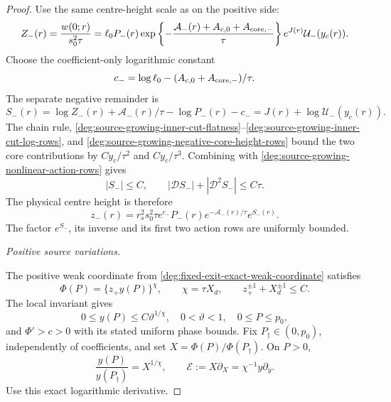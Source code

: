 \begin{proof}
Use the same centre-height scale as on the positive side:
\begin{equation}
 Z_-(r)=\frac{w(0;r)}{s_0^2\tau}
 =\ell_0P_-(r)
       \exp\left\{-\frac{\mathcal A_-(r)+A_{c,0}
                             +A_{\rm core,-}}{\tau}\right\}
       e^{J(r)}\mathcal U_-(y_c(r)).
 \label{deg:source-growing-negative-centre-height}
\end{equation}
Choose the coefficient-only logarithmic constant
\begin{equation}
 c_-=\log\ell_0-(A_{c,0}+A_{\rm core,-})/\tau .
 \label{deg:source-growing-negative-coefficient-constant}
\end{equation}
The separate negative remainder is
\begin{equation}
 S_-(r)=\log Z_-(r)+\mathcal A_-(r)/\tau
                            -\log P_-(r)-c_-
       =J(r)+\log \mathcal U_-(y_c(r)).
 \label{deg:source-growing-negative-source-remainder}
\end{equation}
The chain rule, \eqref{deg:source-growing-inner-cut-flatness}--\eqref{deg:source-growing-inner-cut-log-rows}, and \eqref{deg:source-growing-negative-core-height-rows} bound the two
core contributions by \(Cy_c/\tau^2\) and \(Cy_c/\tau^3\).
Combining with \eqref{deg:source-growing-nonlinear-action-rows} gives
\begin{equation}
 |S_-|\le C,\qquad
 |\mathcal DS_-|+|\mathcal D^2S_-|\le C\tau .
 \label{deg:source-growing-negative-source-rows}
\end{equation}
The physical centre height is therefore
\begin{equation}\label{deg:source-growing-physical-negative-height}
 z_-(r)=r_s^2s_0^2\tau e^{c_-}P_-(r)
                  e^{-\mathcal A_-(r)/\tau}e^{S_-(r)}.
\end{equation}
The factor \(e^{S_-}\), its inverse and its first two action
rows are uniformly bounded.


\smallskip
\noindent\emph{Positive source variations.}

The positive weak coordinate from
\eqref{deg:fixed-exit-exact-weak-coordinate} satisfies
\begin{equation}
 \Phi(P)=\{z_+y(P)\}^{\chi},\qquad
 \chi=\tau X_d,\qquad z_+^{\pm1}+X_d^{\pm1}\le C .
 \label{deg:source-growing-positive-exact-coordinate}
\end{equation}
The local invariant gives
\begin{equation}
 0\le y(P)\le C\vartheta^{1/\chi},\quad
 0<\vartheta<1,\quad 0\le P\le p_0,
 \label{deg:source-growing-positive-weak-flatness}
\end{equation}
and \(\Phi'>c>0\) with its stated uniform phase bounds.
Fix \(P_\dagger\in(0,p_0)\), independently of coefficients,
and set \(X=\Phi(P)/\Phi(P_\dagger)\).  On \(P>0\),
\begin{equation}
 \frac{y(P)}{y(P_\dagger)}=X^{1/\chi},\qquad
 \mathcal E:=X\partial_X=\chi^{-1}y\partial_y .
 \label{deg:source-growing-positive-log-phase}
\end{equation}
Use this exact logarithmic derivative.


\end{proof}
